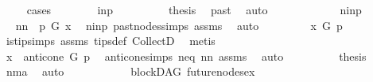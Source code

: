 \begin{isabellebody}
\ \ \ \ \isamarkupfalse%
{\isacharparenleft}{\kern0pt}cases{\isacharparenright}{\kern0pt}\isanewline
\ \ \ \ \ \ \isamarkupfalse%
\ in{\isacharunderscore}{\kern0pt}p\isanewline
\ \ \ \ \ \ \isamarkupfalse%
\ \isamarkupfalse%
\ {\isacharquery}{\kern0pt}thesis\ \isamarkupfalse%
\ past\ \isamarkupfalse%
\ auto\isanewline
\ \ \ \ \isamarkupfalse%
\isanewline
\ \ \ \ \ \ \isamarkupfalse%
\ nin{\isacharunderscore}{\kern0pt}p\isanewline
\ \ \ \ \ \ \isamarkupfalse%
\ \isamarkupfalse%
\ nn{\isacharcolon}{\kern0pt}\ {\isachardoublequoteopen}{\isasymnot}\ p\ {\isasymrightarrow}\isactrlsup {\isacharplus}{\kern0pt}\isactrlbsub G\isactrlesub \ x{\isachardoublequoteclose}\ \isamarkupfalse%
\ nin{\isacharunderscore}{\kern0pt}p\ past{\isacharunderscore}{\kern0pt}nodes{\isachardot}{\kern0pt}simps\ assms{\isacharparenleft}{\kern0pt}{}{\isacharparenright}{\kern0pt}\ \isamarkupfalse%
\ auto\isanewline
\ \ \ \ \ \ \isamarkupfalse%
\ {\isachardoublequoteopen}{\isasymnot}\ x\ {\isasymrightarrow}\isactrlsup {\isacharplus}{\kern0pt}\isactrlbsub G\isactrlesub \ p{\isachardoublequoteclose}\ \isamarkupfalse%
\ is{\isacharunderscore}{\kern0pt}tip{\isachardot}{\kern0pt}simps\ assms\ tips{\isacharunderscore}{\kern0pt}def\ CollectD\ \isamarkupfalse%
\ metis\ \ \ \ \ \ \ \ \ \ \isanewline
\ \ \ \ \ \ \isamarkupfalse%
\ \isamarkupfalse%
\ {\isachardoublequoteopen}x\ {\isasymin}\ anticone\ G\ p{\isachardoublequoteclose}\ \isamarkupfalse%
\ anticone{\isachardot}{\kern0pt}simps\ neq\ nn\ assms{\isacharparenleft}{\kern0pt}{}{\isacharparenright}{\kern0pt}\ \isamarkupfalse%
\ auto\isanewline
\ \ \ \ \ \ \isamarkupfalse%
\ \isamarkupfalse%
\ {\isacharquery}{\kern0pt}thesis\ \isamarkupfalse%
\ nma\ \isamarkupfalse%
\ auto\ \ \isanewline
\ \ \ \ \isamarkupfalse%
\isanewline
\ \ \isamarkupfalse%
\isanewline
{}\isamarkupfalse%
%
\endisatagproof
{\isafoldproof}%
%
\isadelimproof
%
\endisadelimproof
%
\isadelimdocument
%
\endisadelimdocument
%
\isatagdocument
%
\isamarkuptrue%
%
\endisatagdocument
{\isafolddocument}%
%
\isadelimdocument
%
\endisadelimdocument
{}\isamarkupfalse%
\ {\isacharparenleft}{\kern0pt}\ blockDAG{\isacharparenright}{\kern0pt}\ future{\isacharunderscore}{\kern0pt}nodes{\isacharunderscore}{\kern0pt}ex{\isacharcolon}{\kern0pt}\isanewline

\end{isabellebody}
